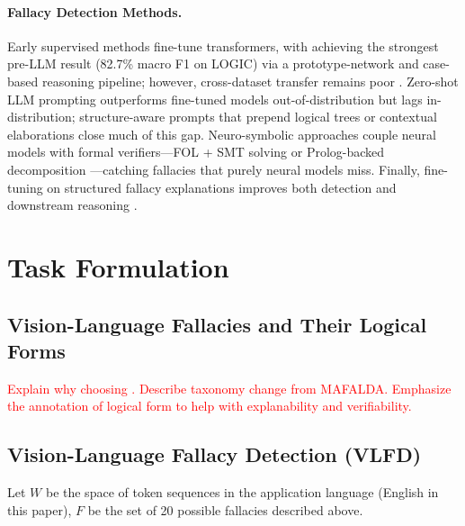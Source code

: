 \documentclass[11pt]{article}
\newcommand{\red}[1]{\textcolor{red}{#1}}
\begin{document}
\paragraph{Fallacy Detection Methods.}
Early supervised methods fine-tune transformers, with \citet{sourati_logical_2023} achieving the strongest pre-LLM result (82.7\% macro F1 on LOGIC) via a prototype-network and case-based reasoning pipeline; however, cross-dataset transfer remains poor \citep{alhindi_multitask_2022}.
Zero-shot LLM prompting \citep{pan_fallacies_2024} outperforms fine-tuned models out-of-distribution but lags in-distribution; structure-aware prompts that prepend logical trees \citep{lei_logical_2024} or contextual elaborations \citep{jeong_ceg_2025} close much of this gap.
Neuro-symbolic approaches couple neural models with formal verifiers---FOL + SMT solving \citep{lalwani_nl2fol_2025} or Prolog-backed decomposition \citep{wang_aid-lf_2025}---catching fallacies that purely neural models miss.
Finally, fine-tuning on structured fallacy explanations improves both detection and downstream reasoning \citep{li_reason_2024,hasanain_propxplain_2025}.







\section{Task Formulation}

\subsection{Vision-Language Fallacies and Their Logical Forms}
\red{Explain why choosing \citet{helwe_mafalda_2024}. Describe taxonomy change from MAFALDA. Emphasize the annotation of logical form to help with explanability and verifiability.}

\subsection{Vision-Language Fallacy Detection (VLFD)}

Let $W$ be the space of token sequences in the application language (English in this paper), $F$ be the set of 20 possible fallacies described above.
\end{document}
